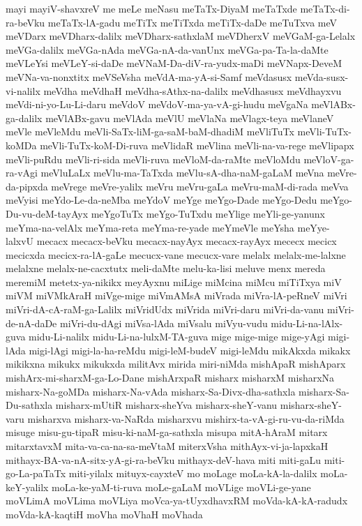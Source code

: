 {mayi
mayiV-shavxreV
me
meLe
meNasu
meTaTx-DiyaM
meTaTxde
meTaTx-di-ra-beVku
meTaTx-lA-gadu
meTiTx
meTiTxda
meTiTx-daDe
meTuTxva
meV
meVDarx
meVDharx-dalilx
meVDharx-sathxlaM
meVDherxV
meVGaM-ga-Lelalx
meVGa-dalilx
meVGa-nAda
meVGa-nA-da-vanUnx
meVGa-pa-Ta-la-daMte
meVLeYsi
meVLeY-si-daDe
meVNaM-Da-diV-ra-yudx-maDi
meVNapx-DeveM
meVNa-va-nonxtitx
meVSeVsha
meVdA-ma-yA-si-Samf
meVdasusx
meVda-susx-vi-nalilx
meVdha
meVdhaH
meVdha-sAthx-na-dalilx
meVdhasusx
meVdhayxvu
meVdi-ni-yo-Lu-Li-daru
meVdoV
meVdoV-ma-ya-vA-gi-hudu
meVgaNa
meVlABx-ga-dalilx
meVlABx-gavu
meVlAda
meVlU
meVlaNa
meVlagx-teya
meVlaneV
meVle
meVleMdu
meVli-SaTx-liM-ga-saM-baM-dhadiM
meVliTuTx
meVli-TuTx-koMDa
meVli-TuTx-koM-Di-ruva
meVlidaR
meVlina
meVli-na-va-rege
meVlipapx
meVli-puRdu
meVli-ri-sida
meVli-ruva
meVloM-da-raMte
meVloMdu
meVloV-ga-ra-vAgi
meVluLaLx
meVlu-ma-TaTxda
meVlu-sA-dha-naM-gaLaM
meVna
meVre-da-pipxda
meVrege
meVre-yalilx
meVru
meVru-gaLa
meVru-maM-di-rada
meVva
meVyisi
meYdo-Le-da-neMba
meYdoV
meYge
meYgo-Dade
meYgo-Dedu
meYgo-Du-vu-deM-tayAyx
meYgoTuTx
meYgo-TuTxdu
meYlige
meYli-ge-yanunx
meYma-na-velAlx
meYma-reta
meYma-re-yade
meYmeVle
meYsha
meYye-lalxvU
mecacx
mecacx-beVku
mecacx-nayAyx
mecacx-rayAyx
mececx
mecicx
mecicxda
mecicx-ra-lA-gaLe
mecucx-vane
mecucx-vare
melalx
melalx-me-lalxne
melalxne
melalx-ne-cacxtutx
meli-daMte
melu-ka-lisi
meluve
menx
mereda
meremiM
metetx-ya-nikikx
meyAyxnu
miLige
miMcina
miMcu
miTiTxya
miV
miVM
miVMkAraH
miVge-mige
miVmAMsA
miVrada
miVra-lA-peRneV
miVri
miVri-dA-cA-raM-ga-Lalilx
miVridUdx
miVrida
miVri-daru
miVri-da-vanu
miVri-de-nA-daDe
miVri-du-dAgi
miVsa-lAda
miVsalu
miVyu-vudu
midu-Li-na-lAlx-guva
midu-Li-nalilx
midu-Li-na-lulxM-TA-guva
mige
mige-mige
mige-yAgi
migi-lAda
migi-lAgi
migi-la-ha-reMdu
migi-leM-budeV
migi-leMdu
mikAkxda
mikakx
mikikxna
mikukx
mikukxda
militAvx
mirida
miri-niMda
mishApaR
mishAparx
mishArx-mi-sharxM-ga-Lo-Dane
mishArxpaR
misharx
misharxM
misharxNa
misharx-Na-goMDa
misharx-Na-vAda
misharx-Sa-Divx-dha-sathxla
misharx-Sa-Du-sathxla
misharx-mUtiR
misharx-sheYva
misharx-sheY-vanu
misharx-sheY-varu
misharxva
misharx-va-NaRda
misharxvu
mishirx-ta-vA-gi-ru-vu-da-riMda
misuge
misu-gu-tipaR
misu-ki-naM-ga-sathxla
misupa
mitA-hAraM
mitarx
mitarxtavxM
mita-va-ca-na-sa-meVtaM
miterxVsha
mithAyx-vi-ja-lapxkaH
mithayx-BA-va-nA-sitx-yA-gi-ra-beVku
mithayx-deV-hava
miti
miti-gaLu
miti-go-La-paTaTx
miti-yilalx
mituyx-cayxteV
mo
moLage
moLa-kA-la-dalilx
moLa-keY-yalilx
moLa-ke-yaM-ti-ruva
moLe-gaLaM
moVLige
moVLi-ge-yane
moVLimA
moVLima
moVLiya
moVca-ya-tUyxdhavxRM
moVda-kA-kA-radudx
moVda-kA-kaqtiH
moVha
moVhaH
moVhada
}

